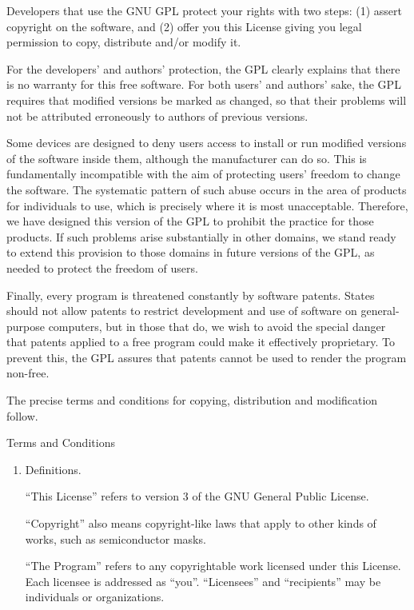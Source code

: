 \documentclass[11pt,a4paper]{refrep}
\begin{document}
\begin{fullpage}
Developers that use the GNU GPL protect your rights with two steps:
(1) assert copyright on the software, and (2) offer you this License
giving you legal permission to copy, distribute and/or modify it.

For the developers' and authors' protection, the GPL clearly explains
that there is no warranty for this free software.  For both users' and
authors' sake, the GPL requires that modified versions be marked as
changed, so that their problems will not be attributed erroneously to
authors of previous versions.

Some devices are designed to deny users access to install or run
modified versions of the software inside them, although the manufacturer
can do so.  This is fundamentally incompatible with the aim of
protecting users' freedom to change the software.  The systematic
pattern of such abuse occurs in the area of products for individuals to
use, which is precisely where it is most unacceptable.  Therefore, we
have designed this version of the GPL to prohibit the practice for those
products.  If such problems arise substantially in other domains, we
stand ready to extend this provision to those domains in future versions
of the GPL, as needed to protect the freedom of users.

Finally, every program is threatened constantly by software patents.
States should not allow patents to restrict development and use of
software on general-purpose computers, but in those that do, we wish to
avoid the special danger that patents applied to a free program could
make it effectively proprietary.  To prevent this, the GPL assures that
patents cannot be used to render the program non-free.

The precise terms and conditions for copying, distribution and
modification follow.

\begin{center}
{\Large \sc Terms and Conditions}
\end{center}


\begin{enumerate}

\addtocounter{enumi}{-1}

\item Definitions.

``This License'' refers to version 3 of the GNU General Public License.

``Copyright'' also means copyright-like laws that apply to other kinds of
works, such as semiconductor masks.

``The Program'' refers to any copyrightable work licensed under this
License.  Each licensee is addressed as ``you''.  ``Licensees'' and
``recipients'' may be individuals or organizations.


\end{enumerate}
\end{fullpage}
\end{document}
